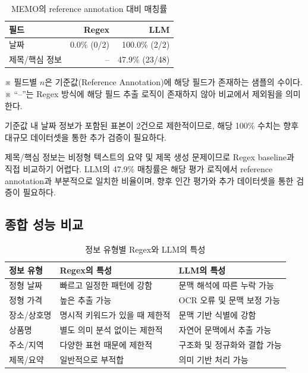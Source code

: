 \documentclass[11pt,a4paper]{article}
\begin{document}
\begin{table}[H]
\centering
\small
\begin{tabularx}{0.92\linewidth}{l r r}
\toprule
\textbf{필드} & \textbf{Regex} & \textbf{LLM}\\
\midrule
날짜 & 0.0\% (0/2) & 100.0\% (2/2)\\
제목/핵심 정보 & -- & 47.9\% (23/48)\\
\bottomrule
\end{tabularx}
\caption{MEMO의 reference annotation 대비 매칭률}
\end{table}
\vspace{-0.3em}
\begin{flushleft}
\footnotesize ※ 필드별 $n$은 기준값(Reference Annotation)에 해당 필드가 존재하는 샘플의 수이다. ※ ``--''는 Regex 방식에 해당 필드 추출 로직이 존재하지 않아 비교에서 제외됨을 의미한다.
\end{flushleft}


기준값 내 날짜 정보가 포함된 표본이 2건으로 제한적이므로, 해당 100\% 수치는 향후 대규모 데이터셋을 통한 추가 검증이 필요하다.

제목/핵심 정보는 비정형 텍스트의 요약 및 제목 생성 문제이므로 Regex baseline과 직접 비교하기 어렵다. LLM의 47.9\% 매칭률은 해당 평가 로직에서 reference annotation과 부분적으로 일치한 비율이며, 향후 인간 평가와 추가 데이터셋을 통한 검증이 필요하다.

\subsection{종합 성능 비교}

\begin{table}[H]
\centering
\small
\begin{tabularx}{\linewidth}{l Y Y}
\toprule
\textbf{정보 유형} & \textbf{Regex의 특성} & \textbf{LLM의 특성}\\
\midrule
정형 날짜 & 빠르고 일정한 패턴에 강함 & 문맥 해석에 따른 누락 가능\\
정형 가격 & 높은 추출 가능 & OCR 오류 및 문맥 보정 가능\\
장소/상호명 & 명시적 키워드가 있을 때 제한적 & 문맥 기반 식별에 강함\\
상품명 & 별도 의미 분석 없이는 제한적 & 자연어 문맥에서 추출 가능\\
주소/지역 & 다양한 표현 때문에 제한적 & 구조화 및 정규화와 결합 가능\\
제목/요약 & 일반적으로 부적합 & 의미 기반 처리 가능\\
\bottomrule
\end{tabularx}
\caption{정보 유형별 Regex와 LLM의 특성}
\end{table}
\end{document}
